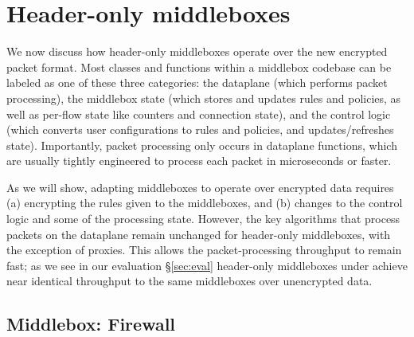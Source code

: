 \section{Header-only middleboxes}
\label{sec:homiddleboxes}
We now discuss how header-only middleboxes operate over the new encrypted packet format.
Most classes and functions within a middlebox codebase can be labeled as one of these three categories: the dataplane (which performs packet processing), the middlebox state (which stores and updates rules and policies, as well as per-flow state like counters and connection state), and the control logic (which converts user configurations to rules and policies, and updates/refreshes state). 
Importantly, packet processing only occurs in dataplane functions, which are usually tightly engineered to process each packet in microseconds or faster.

As we will show, adapting middleboxes to operate over encrypted data requires (a) encrypting the rules given to the middleboxes, and (b) changes to the control logic and some of the processing state. 
However, the key algorithms that process packets on the dataplane remain unchanged for header-only middleboxes, with the exception of proxies.
This allows the packet-processing throughput to remain fast; as we see in our evaluation \S\ref{sec:eval} header-only middleboxes under \sys achieve near identical throughput to the same middleboxes over unencrypted data. 

\subsection{Middlebox: Firewall}\label{sec:firewall}


